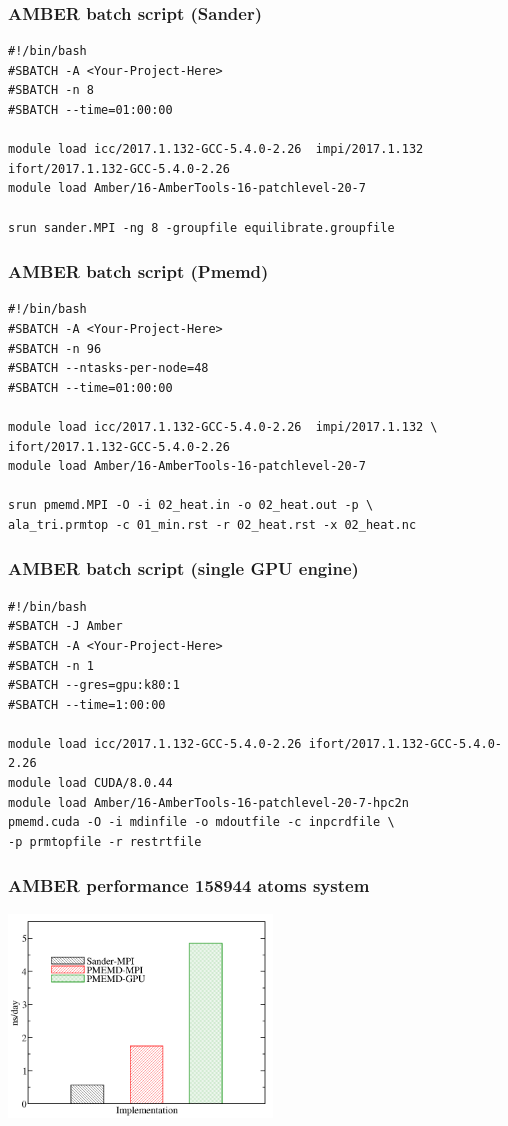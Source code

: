 \begin{frame}[fragile]
	\frametitle{AMBER batch script (Sander)}
        \begin{verbatim}             
#!/bin/bash
#SBATCH -A <Your-Project-Here>
#SBATCH -n 8
#SBATCH --time=01:00:00

module load icc/2017.1.132-GCC-5.4.0-2.26  impi/2017.1.132 ifort/2017.1.132-GCC-5.4.0-2.26
module load Amber/16-AmberTools-16-patchlevel-20-7

srun sander.MPI -ng 8 -groupfile equilibrate.groupfile
        \end{verbatim}

\end{frame}

\begin{frame}[fragile]
	\frametitle{AMBER batch script (Pmemd)}
        \begin{verbatim}             
#!/bin/bash
#SBATCH -A <Your-Project-Here>
#SBATCH -n 96
#SBATCH --ntasks-per-node=48
#SBATCH --time=01:00:00

module load icc/2017.1.132-GCC-5.4.0-2.26  impi/2017.1.132 \
ifort/2017.1.132-GCC-5.4.0-2.26
module load Amber/16-AmberTools-16-patchlevel-20-7

srun pmemd.MPI -O -i 02_heat.in -o 02_heat.out -p \
ala_tri.prmtop -c 01_min.rst -r 02_heat.rst -x 02_heat.nc
        \end{verbatim}

\end{frame}

\begin{frame}[fragile]
	\frametitle{AMBER batch script (single GPU engine)}
        \begin{verbatim}             
#!/bin/bash
#SBATCH -J Amber
#SBATCH -A <Your-Project-Here>
#SBATCH -n 1
#SBATCH --gres=gpu:k80:1
#SBATCH --time=1:00:00

module load icc/2017.1.132-GCC-5.4.0-2.26 ifort/2017.1.132-GCC-5.4.0-2.26
module load CUDA/8.0.44
module load Amber/16-AmberTools-16-patchlevel-20-7-hpc2n
pmemd.cuda -O -i mdinfile -o mdoutfile -c inpcrdfile \
-p prmtopfile -r restrtfile
        \end{verbatim}

\end{frame}

\begin{frame}
	\frametitle{AMBER performance 158944 atoms system}
        \begin{center}
		\includegraphics[width=7cm]{images/profiling_amber.png}
        \end{center}
\end{frame}


